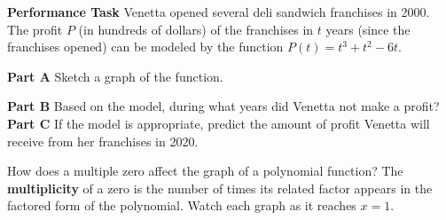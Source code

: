 \renewcommand{\arraystretch}{1.35}

\textbf{Performance Task} Venetta opened several deli sandwich franchises in 2000. The profit $P$ (in hundreds of dollars) of the franchises in $t$ years (since the franchises opened) can be modeled by the function $P(t)=t^3+t^2-6t$.

\begin{minipage}[t]{0.42\textwidth}
\vspace{0pt}
\textbf{Part A} Sketch a graph of the function.

\end{minipage}\hfill
\begin{minipage}[t]{0.55\textwidth}
\vspace{0pt}
\textbf{Part B} Based on the model, during what years did Venetta not make a profit?
\lines[2]
\textbf{Part C} If the model is appropriate, predict the amount of profit Venetta will receive from her franchises in 2020.
\lines[2]
\end{minipage}

\newpage
{}
How does a multiple zero affect the graph of a polynomial function? The \textbf{multiplicity} of a zero is the number of times its related factor appears in the factored form of the polynomial. Watch each graph as it reaches $x=1$.

